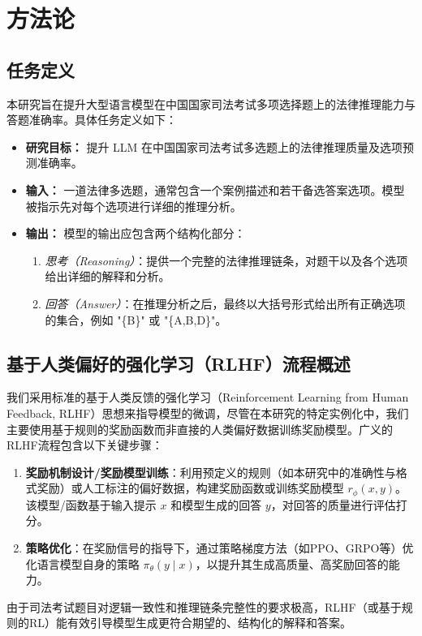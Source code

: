 \documentclass{article}
\begin{document}
\section{方法论}

\subsection{任务定义}
本研究旨在提升大型语言模型在中国国家司法考试多项选择题上的法律推理能力与答题准确率。具体任务定义如下：

\begin{itemize}
  \item \textbf{研究目标：}
    提升 LLM 在中国国家司法考试多选题上的法律推理质量及选项预测准确率。
  \item \textbf{输入：}
    一道法律多选题，通常包含一个案例描述和若干备选答案选项。模型被指示先对每个选项进行详细的推理分析。
  \item \textbf{输出：}
    模型的输出应包含两个结构化部分：
    \begin{enumerate}
      \item \emph{思考（Reasoning）}：提供一个完整的法律推理链条，对题干以及各个选项给出详细的解释和分析。
      \item \emph{回答（Answer）}：在推理分析之后，最终以大括号形式给出所有正确选项的集合，例如 "\{B\}" 或 "\{A,B,D\}"。
    \end{enumerate}
\end{itemize}

\subsection{基于人类偏好的强化学习（RLHF）流程概述}
我们采用标准的基于人类反馈的强化学习（Reinforcement Learning from Human Feedback, RLHF）思想来指导模型的微调，尽管在本研究的特定实例化中，我们主要使用基于规则的奖励函数而非直接的人类偏好数据训练奖励模型。广义的RLHF流程包含以下关键步骤：
\begin{enumerate}
    \item \textbf{奖励机制设计/奖励模型训练}：利用预定义的规则（如本研究中的准确性与格式奖励）或人工标注的偏好数据，构建奖励函数或训练奖励模型 $r_{\phi}(x, y)$。该模型/函数基于输入提示 $x$ 和模型生成的回答 $y$，对回答的质量进行评估打分。
    \item \textbf{策略优化}：在奖励信号的指导下，通过策略梯度方法（如PPO、GRPO等）优化语言模型自身的策略 $\pi_{\theta}(y \mid x)$，以提升其生成高质量、高奖励回答的能力。
\end{enumerate}
由于司法考试题目对逻辑一致性和推理链条完整性的要求极高，RLHF（或基于规则的RL）能有效引导模型生成更符合期望的、结构化的解释和答案。
\end{document}

